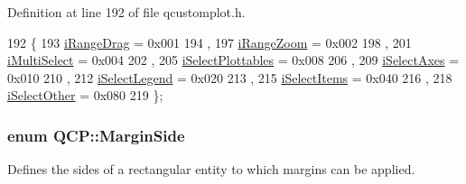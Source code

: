 Definition at line 192 of file qcustomplot.\+h.


\begin{DoxyCode}
192                  \{
193   \hyperlink{namespace_q_c_p_a2ad6bb6281c7c2d593d4277b44c2b037a2c4432b9aceafb94000be8d1b589ef18}{iRangeDrag} = 0x001 
194   ,
197   \hyperlink{namespace_q_c_p_a2ad6bb6281c7c2d593d4277b44c2b037abee1e94353525a636aeaf0ba32b72e14}{iRangeZoom} = 0x002 
198   ,
201   \hyperlink{namespace_q_c_p_a2ad6bb6281c7c2d593d4277b44c2b037aef673112c5067c3cf4cfddb62da7265d}{iMultiSelect} = 0x004 
202   ,
205   \hyperlink{namespace_q_c_p_a2ad6bb6281c7c2d593d4277b44c2b037a67148c8227b4155eca49135fc274c7ec}{iSelectPlottables} = 0x008 
206   ,
209   \hyperlink{namespace_q_c_p_a2ad6bb6281c7c2d593d4277b44c2b037ad6644ac55bef621645326e9dd7469caa}{iSelectAxes} = 0x010 
210   ,
212   \hyperlink{namespace_q_c_p_a2ad6bb6281c7c2d593d4277b44c2b037a269c9af298e257d1108edec0432b5513}{iSelectLegend} = 0x020 
213   ,
215   \hyperlink{namespace_q_c_p_a2ad6bb6281c7c2d593d4277b44c2b037aea2f7c105d674e76d9b187b02ef29260}{iSelectItems} = 0x040 
216   ,
218   \hyperlink{namespace_q_c_p_a2ad6bb6281c7c2d593d4277b44c2b037af67a50bc26147a13b551b3a625374949}{iSelectOther} = 0x080 
219 \};
\end{DoxyCode}
\hypertarget{namespace_q_c_p_a7e487e3e2ccb62ab7771065bab7cae54}{}
\subsubsection[{Margin\+Side}]{\setlength{\rightskip}{0pt plus 5cm}enum {\bf Q\+C\+P\+::\+Margin\+Side}}\label{namespace_q_c_p_a7e487e3e2ccb62ab7771065bab7cae54}
Defines the sides of a rectangular entity to which margins can be applied.

